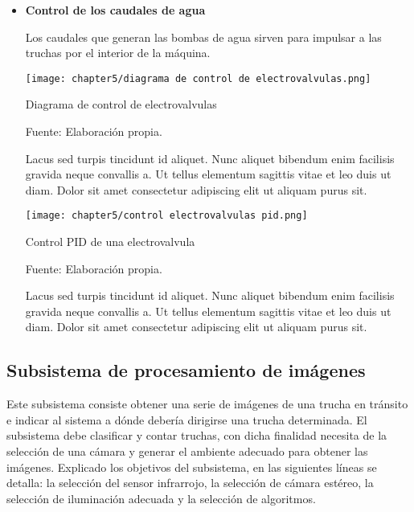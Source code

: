 \begin{itemize}
	\item \textbf{Control de los caudales de agua}
	
	Los caudales que generan las bombas de agua sirven para impulsar a las truchas por el interior de la máquina. 
	
	
	\begin{myfigure}[H]
		\centering
		\texttt{[image: chapter5/diagrama de control de electrovalvulas.png]}
		\caption{Diagrama de control de electrovalvulas}
		\begin{myflushleftportland}
			Fuente: Elaboración propia.
		\end{myflushleftportland}
		\label{fig:diagrama de control de electrovalvulas}
	\end{myfigure}

	Lacus sed turpis tincidunt id aliquet. Nunc aliquet bibendum enim facilisis gravida neque convallis a. Ut tellus elementum sagittis vitae et leo duis ut diam. Dolor sit amet consectetur adipiscing elit ut aliquam purus sit. 
	
	\begin{myfigure}[H]
		\centering
		\texttt{[image: chapter5/control electrovalvulas pid.png]}
		\caption{Control PID de una electrovalvula}
		\begin{myflushleftportland}
			Fuente: Elaboración propia.
		\end{myflushleftportland}
		\label{fig:control electrovalvulas pid}
	\end{myfigure}
	
	Lacus sed turpis tincidunt id aliquet. Nunc aliquet bibendum enim facilisis gravida neque convallis a. Ut tellus elementum sagittis vitae et leo duis ut diam. Dolor sit amet consectetur adipiscing elit ut aliquam purus sit. 


\end{itemize}

\subsection{Subsistema de procesamiento de imágenes}
\label{ssec:subsistema de procesamiento de imágenes}

Este subsistema consiste obtener una serie de imágenes de una trucha en tránsito e indicar al sistema a dónde debería dirigirse una trucha determinada. El subsistema debe clasificar y contar truchas, con dicha finalidad necesita de la selección de una cámara y generar el ambiente adecuado para obtener las imágenes. Explicado los objetivos del subsistema, en las siguientes líneas se detalla: la selección del sensor infrarrojo, la selección de cámara estéreo, la selección de iluminación adecuada y la selección de algoritmos.

